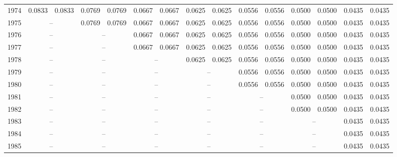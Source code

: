 \begin{table}[H]
\begin{tabular}{rrrrrrrrrrrrrrr}
1974 & 0.0833 & 0.0833 & 0.0769 & 0.0769 & 0.0667 & 0.0667 & 0.0625 & 0.0625 & 0.0556 & 0.0556 & 0.0500 & 0.0500 & 0.0435 & 0.0435 \\
1975 & \multicolumn{2}{c}{--} & 0.0769 & 0.0769 & 0.0667 & 0.0667 & 0.0625 & 0.0625 & 0.0556 & 0.0556 & 0.0500 & 0.0500 & 0.0435 & 0.0435 \\
1976 & \multicolumn{2}{c}{--} & \multicolumn{2}{c}{--} & 0.0667 & 0.0667 & 0.0625 & 0.0625 & 0.0556 & 0.0556 & 0.0500 & 0.0500 & 0.0435 & 0.0435 \\
1977 & \multicolumn{2}{c}{--} & \multicolumn{2}{c}{--} & 0.0667 & 0.0667 & 0.0625 & 0.0625 & 0.0556 & 0.0556 & 0.0500 & 0.0500 & 0.0435 & 0.0435 \\
1978 & \multicolumn{2}{c}{--} & \multicolumn{2}{c}{--} & \multicolumn{2}{c}{--} & 0.0625 & 0.0625 & 0.0556 & 0.0556 & 0.0500 & 0.0500 & 0.0435 & 0.0435 \\
1979 & \multicolumn{2}{c}{--} & \multicolumn{2}{c}{--} & \multicolumn{2}{c}{--} & \multicolumn{2}{c}{--} & 0.0556 & 0.0556 & 0.0500 & 0.0500 & 0.0435 & 0.0435 \\
1980 & \multicolumn{2}{c}{--} & \multicolumn{2}{c}{--} & \multicolumn{2}{c}{--} & \multicolumn{2}{c}{--} & 0.0556 & 0.0556 & 0.0500 & 0.0500 & 0.0435 & 0.0435 \\
1981 & \multicolumn{2}{c}{--} & \multicolumn{2}{c}{--} & \multicolumn{2}{c}{--} & \multicolumn{2}{c}{--} & \multicolumn{2}{c}{--} & 0.0500 & 0.0500 & 0.0435 & 0.0435 \\
1982 & \multicolumn{2}{c}{--} & \multicolumn{2}{c}{--} & \multicolumn{2}{c}{--} & \multicolumn{2}{c}{--} & \multicolumn{2}{c}{--} & 0.0500 & 0.0500 & 0.0435 & 0.0435 \\
1983 & \multicolumn{2}{c}{--} & \multicolumn{2}{c}{--} & \multicolumn{2}{c}{--} & \multicolumn{2}{c}{--} & \multicolumn{2}{c}{--} & \multicolumn{2}{c}{--} & 0.0435 & 0.0435 \\
1984 & \multicolumn{2}{c}{--} & \multicolumn{2}{c}{--} & \multicolumn{2}{c}{--} & \multicolumn{2}{c}{--} & \multicolumn{2}{c}{--} & \multicolumn{2}{c}{--} & 0.0435 & 0.0435 \\
1985 & \multicolumn{2}{c}{--} & \multicolumn{2}{c}{--} & \multicolumn{2}{c}{--} & \multicolumn{2}{c}{--} & \multicolumn{2}{c}{--} & \multicolumn{2}{c}{--} & 0.0435 & 0.0435 \\
\bottomrule
\end{tabular}
\end{table}